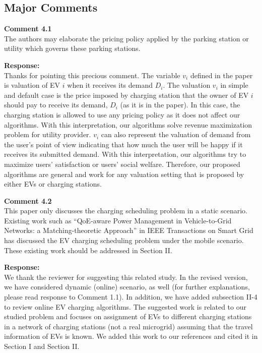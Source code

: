 \documentclass[11pt]{article}
\begin{document}
\subsection{Major Comments}

{\color{blue}
\noindent\textbf{Comment 4.1}\\
The authors may elaborate the pricing policy applied by the parking station or utility which governs these parking stations.}

\vspace{2mm}
\noindent\textbf{Response:}\\
Thanks for pointing this precious comment. The variable $v_i$ defined in the paper is valuation of EV $i$ when it receives its demand $D_i$. The valuation $v_i$ in simple and default case is the price imposed by charging station that the owner of EV $i$ should pay to receive its demand, $D_i$ (as it is in the paper). In this case, the charging station is allowed to use any pricing policy as it does not affect our algorithms. With this interpretation, our algorithms solve revenue maximization problem for utility provider. $v_i$ can also represent the valuation of demand from the user's point of view indicating that how much the user will be happy if it receives its submitted demand. With this interpretation, our algorithms try to maximize users' satisfaction or users' social welfare. Therefore, our proposed algorithms are general and work for any valuation setting that is proposed by either EVs or charging stations.

\vspace{5mm}
{\color{blue}
\noindent\textbf{Comment 4.2}\\
This paper only discusses the charging scheduling problem in a static scenario. Existing work such as “QoE-aware Power Management in Vehicle-to-Grid Networks: a Matching-theoretic Approach” in IEEE Transactions on Smart Grid has discussed the EV charging scheduling problem under the mobile scenario. These existing work should be addressed in Section II.}

\vspace{2mm}
\noindent\textbf{Response:}\\
We thank the reviewer for suggesting this related study. In the revised version, we have considered dynamic (online) scenario, as well (for further explanations, please read response to Comment 1.1). In addition, we have added subsection II-4 to review online EV charging algorithms.
The suggested work is related to our studied problem and focuses on assignment of EVs to different charging stations in a network of charging stations (not a real microgrid) assuming that the travel information of EVs is known. We added this work to our references and cited it in Section I and Section II. 
\end{document}
